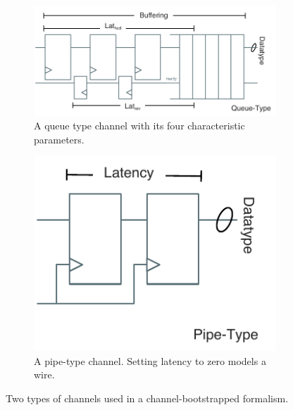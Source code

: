 \begin{figure}[htb]
    \centering
    \begin{subfigure}[t]{0.65\textwidth}
        \captionsetup{margin=0.25cm}
        \includegraphics[width=\columnwidth]{figures/queue-channel.pdf}
        \caption{A queue type channel with its four characteristic parameters.}
        \label{fig:queue-channel}
    \end{subfigure}
    \begin{subfigure}[t]{0.34\textwidth}
        \captionsetup{margin=0.25cm}
        \includegraphics[width=\columnwidth]{figures/pipe-channel.pdf}
        \caption{A pipe-type channel. Setting latency to zero models a wire.}
        \label{fig:pipe-channel}
    \end{subfigure}
    \centering
    \caption{Two types of channels used in a channel-bootstrapped formalism.}
\end{figure}



